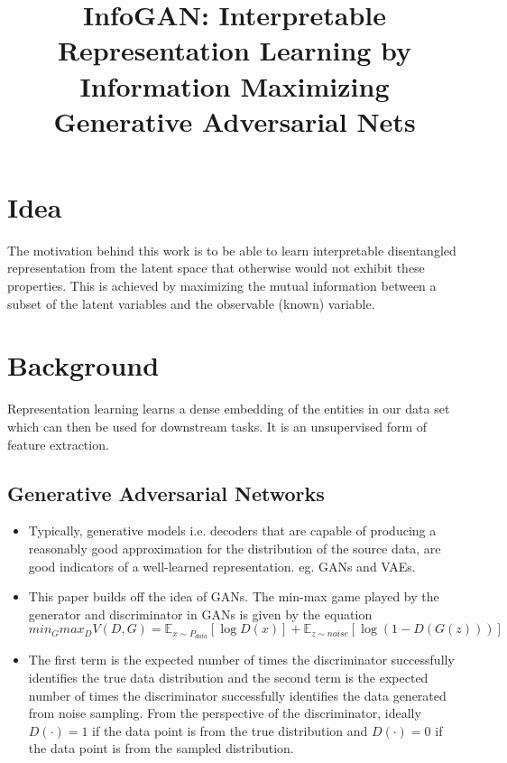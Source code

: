 \documentclass[12pt]{article}
\begin{document}
\title{InfoGAN: Interpretable Representation Learning by Information Maximizing Generative Adversarial Nets}
\author{}
\date{}
\maketitle

\section{Idea}
  The motivation behind this work is to be able to learn interpretable disentangled representation from the latent space that otherwise would not exhibit these properties. This is achieved by maximizing the mutual information between a subset of the latent variables and the observable (known) variable.

\section{Background}
  Representation learning learns a dense embedding of the entities in our data set which can then be used for downstream tasks. It is an unsupervised form of feature extraction.

  \subsection{Generative Adversarial Networks}
  \begin{itemize}
    \item Typically, generative models i.e. decoders that are capable of producing a reasonably good approximation for the distribution of the source data, are good indicators of a well-learned representation. eg. GANs\cite{goodfellow2014generative} and VAEs\cite{kingma2013auto}.
    \item This paper builds off the idea of GANs. The min-max game played by the generator and discriminator in GANs is given by the equation $$min_G max_D V(D, G) = \mathbb{E}_{x \sim P_{data}}[\log D(x)] + \mathbb{E}_{z \sim noise} [\log(1 - D(G(z)))]$$
    \item The first term is the expected number of times the discriminator successfully identifies the true data distribution and the second term is the expected number of times the discriminator successfully identifies the data generated from noise sampling. From the perspective of the discriminator, ideally $D(\cdot) = 1$ if the data point is from the true distribution and $D(\cdot) =  0$ if the data point is from the sampled distribution.
  \end{itemize}
\end{document}
